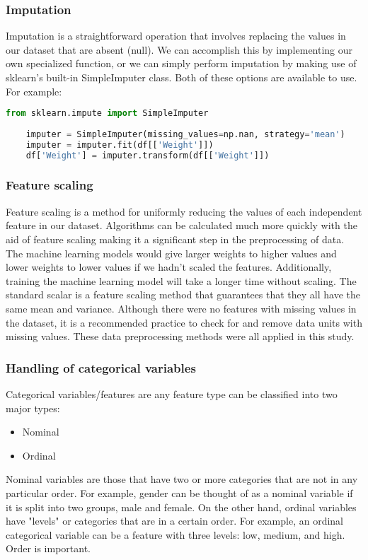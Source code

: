 \subsubsection{Imputation}
Imputation is a straightforward operation that involves replacing the values in our dataset that are absent (null). We can accomplish this by implementing our own specialized function, or we can simply perform imputation by making use of sklearn's built-in SimpleImputer class. Both of these options are available to use. For example:
\begin{lstlisting}[language=Python, numbers=none, label=Simple Imputer]
	from sklearn.impute import SimpleImputer
	
	imputer = SimpleImputer(missing_values=np.nan, strategy='mean')
	imputer = imputer.fit(df[['Weight']])
	df['Weight'] = imputer.transform(df[['Weight']])
\end{lstlisting}

\subsubsection{Feature scaling}

Feature scaling is a method for uniformly reducing the values of each independent feature in our dataset. Algorithms can be calculated much more quickly with the aid of feature scaling making it a significant step in the preprocessing of data. The machine learning models would give larger weights to higher values and lower weights to lower values if we hadn't scaled the features. Additionally, training the machine learning model will take a longer time without scaling. The standard scalar is a feature scaling method that guarantees that they all have the same mean and variance. Although there were no features with missing values in the dataset, it is a recommended practice to check for and remove data units with missing values. These data preprocessing methods were all applied in this study.

\subsubsection{Handling of categorical variables}
Categorical variables/features are any feature type can be classified into two major types:
\begin{itemize}
	\item Nominal
	\item Ordinal
\end{itemize}
Nominal variables are those that have two or more categories that are not in any particular order. For example, gender can be thought of as a nominal variable if it is split into two groups, male and female. On the other hand, ordinal variables have "levels" or categories that are in a certain order. For example, an ordinal categorical variable can be a feature with three levels: low, medium, and high. Order is important.

